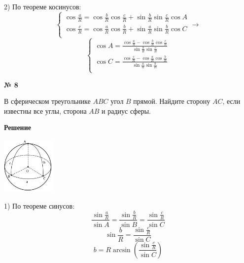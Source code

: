     2) По теореме косинусов:
    \[
        \begin{cases}
            \cos\frac{a}{R} = \cos\frac{b}{R}\cos\frac{c}{R} + \sin\frac{b}{R}\sin\frac{c}{R}\cos A\\
            \cos\frac{c}{R} = \cos\frac{a}{R}\cos\frac{b}{R} + \sin\frac{a}{R}\sin\frac{b}{R}\cos C\\
        \end{cases}
        \rightarrow
    \]
    \[
        \begin{cases}
            \cos A = \frac{\cos\frac{a}{R} - \cos\frac{b}{R}\cos\frac{c}{R}}{\sin\frac{b}{R}\sin\frac{c}{R}}\\
            \cos C = \frac{\cos\frac{c}{R} - \cos\frac{a}{R}\cos\frac{b}{R}}{\sin\frac{a}{R}\sin\frac{b}{R}}\\
        \end{cases}
    \]

     \begin{center}
        \textbf{№ 8}
    \end{center}

    В сферическом треугольнике $ABC$ угол $B$ прямой.
    Найдите сторону $AC$, если известны все углы, сторона $AB$ и радиус сферы.

    \textbf{Решение}\\

    \begin{center}
        \includegraphics[width=0.2\textwidth]{images/img9}\\
    \end{center}

    1) По теореме синусов:
    \[
        \frac{\sin\frac{a}{R}}{\sin A} = \frac{\sin\frac{b}{R}}{\sin B} = \frac{\sin\frac{c}{R}}{\sin C}
    \]
    \[
        \sin\frac{b}{R} = \frac{\sin\frac{c}{R}}{\sin C}
    \]
    \[
        b = R\arcsin\left(\frac{\sin\frac{c}{R}}{\sin C}\right)
    \]


